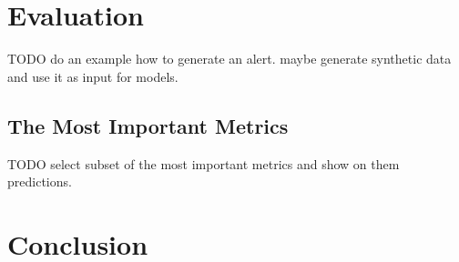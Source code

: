 \chapter{Evaluation}
TODO do an example how to generate an alert.
maybe generate synthetic data and use it as input for models.

    \section{The Most Important Metrics}
    TODO select subset of the most important metrics and show on them predictions.

\chapter{Conclusion}

